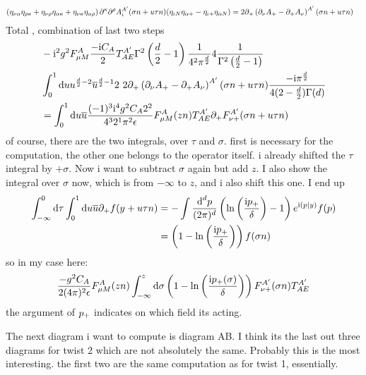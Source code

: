 \begin{align}
	\left(  \eta_{\nu \alpha} \eta_{\rho \kappa}+ \eta_{\nu \rho} \eta_{\alpha\kappa} + \eta_{\nu \kappa} \eta_{\alpha \rho} \right) \partial^\kappa\partial^\rho A_\iota^{A'} (\sigma n+u\tau n)(\eta_{\iota N}\eta_{\alpha +} - \eta_{\iota+ }\eta_{\alpha N})
	&=
	2 \partial_+\left( \partial_\nu A_+ - \partial_+A_\nu\right)^{A'}(\sigma n + u \tau n)
\end{align}
Total , combination of last two steps
\begin{align}
	&-\text{i}^2 g^2 F_{\mu M}^{A}\frac{-\text{i} C_A}{2} T^{A'}_{AE}\Gamma^2\left(\frac{d}{2}-1\right)\frac{1}{4^2\pi^\frac{d}{2}}4 \frac{1}{\Gamma^2\left(\frac{d}{2}-1\right)}
	\\
	&\int_0^1 \text{d} u u^{\frac{d}{2}-2}\overline u^{\frac{d}{2}-1}2~2 \partial_+\left( \partial_\nu A_+ - \partial_+A_\nu\right)^{A'}(\sigma n +  u \tau n)\frac{-\text{i} \pi^{\frac{d}{2}}}{4(2-\frac{d}{2})\Gamma(d)}
	\\
	&=
	\int_0^1 \text{d} u \overline u\frac{(-1)^3\text{i}^{4}g^2C_A2^2}{4^3 2^1\pi^2\epsilon}F_{\mu M}^{A}(zn)T^{A'}_{AE}\partial_+F_{\nu +}^{A'}(\sigma n +  u \tau n)
\end{align}
of course, there are the two integrals, over $\tau$ and $\sigma$. first is necessary for the computation, the other one belongs to the operator itself.
i already shifted the $\tau $ integral by $+\sigma$. Now i want to subtract $\sigma$ again but add $z$. I also show the integral over $\sigma$ now, which is from $-\infty$ to $z$, and i also shift this one. I end up
\begin{align}
	\int_{-\infty}^{0} \text{d} \tau \int_0^1 \text{d} u \overline u \partial_+f(y+  u \tau n)
	&=
	-\int \frac{\text{d} ^d p}{(2\pi)^d}\left( \ln\left(\frac{\text{i} p_{+}}{\delta}\right) -1\right) e^{\text{i} (p|y)}f(p)
	\\
	&=
	\left(1-\ln\left(\frac{\text{i} p_{+}}{\delta}\right)\right)f(\sigma n)
\end{align}
so in my case here:
\begin{align}
	\frac{-g^2C_A}{2(4\pi)^2\epsilon}F_{\mu M}^{A}(zn)\int_{-\infty}^z \text{d}\sigma 	\left(1-\ln\left(\frac{\text{i} p_{+}(\sigma)}{\delta}\right)\right)F_{\nu +}^{A'}(\sigma n)T^{A'}_{AE}
\end{align}
the argument of $p_{+}$ indicates on which field its acting.

The next diagram i want to compute is diagram AB. I think its the last out three diagrams for twist 2 which are not absolutely the same. Probably this is the most interesting. the first two are the same computation as for twist 1, essentially.

